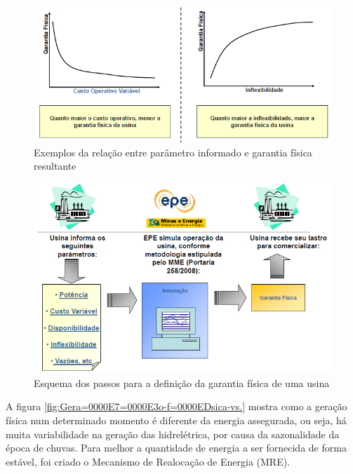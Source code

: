 \begin{figure}
\begin{centering}
\includegraphics{anexos/aula110-4}
\par\end{centering}

\protect\caption{Exemplos da relação entre parâmetro informado e garantia física resultante\label{fig:Exemplos-da-rela=0000E7=0000E3o-1}}
\end{figure}


\begin{figure}
\begin{centering}
\includegraphics[scale=0.8]{anexos/aula110-5}
\par\end{centering}

\protect\caption{Esquema dos passos para a definição da garantia física de uma usina\label{fig:Esquema-dos-passos}}
\end{figure}


A figura \ref{fig:Gera=0000E7=0000E3o-f=0000EDsica-vs.} mostra como
a geração física num determinado momento é diferente da energia assegurada,
ou seja, há muita variabilidade na geração das hidrelétrica, por causa
da sazonalidade da época de chuvas. Para melhor a quantidade de energia
a ser fornecida de forma estável, foi criado o Mecanismo de Realocação
de Energia (MRE). 

